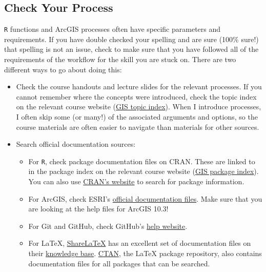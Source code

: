 \documentclass[]{book}
\providecommand{\tightlist}{%
  \setlength{\itemsep}{0pt}\setlength{\parskip}{0pt}}
\theoremstyle{definition}
\theoremstyle{definition}
\theoremstyle{definition}
\theoremstyle{remark}
\begin{document}
\subsection{Check Your Process}\label{check-your-process}

\texttt{R} functions and ArcGIS processes often have specific parameters
and requirements. If you have double checked your spelling and are sure
(100\% sure!) that spelling is not an issue, check to make sure that you
have followed all of the requirements of the workflow for the skill you
are stuck on. There are two different ways to go about doing this:

\begin{itemize}
\tightlist
\item
  Check the course handouts and lecture slides for the relevant
  processes. If you cannot remember where the concepts were introduced,
  check the topic index on the relevant course website
  (\href{https://slu-soc5650.github.io/topic-index/}{GIS topic index}).
  When I introduce processes, I often skip some (or many!) of the
  associated arguments and options, so the course materials are often
  easier to navigate than materials for other sources.
\item
  Search official documentation sources:

  \begin{itemize}
  \tightlist
  \item
    For \texttt{R}, check package documentation files on CRAN. These are
    linked to in the package index on the relevant course website
    (\href{https://slu-soc5650.github.io/package-index/}{GIS package
    index}). You can also use \href{https://cran.r-project.org}{CRAN's
    website} to search for package information.
  \item
    For ArcGIS, check ESRI's
    \href{http://desktop.arcgis.com/en/arcmap/}{official documentation
    files}. Make sure that you are looking at the help files for ArcGIS
    10.3!
  \item
    For Git and GitHub, check GitHub's
    \href{https://help.github.com}{help website}.
  \item
    For LaTeX, \href{https://www.sharelatex.com/}{ShareLaTeX} has an
    excellent set of documentation files on their
    \href{https://www.sharelatex.com/learn/Main_Page}{knowledge base}.
    \href{https://ctan.org}{CTAN}, the LaTeX package repository, also
    contains documentation files for all packages that can be searched.
  \end{itemize}
\end{itemize}
\end{document}
